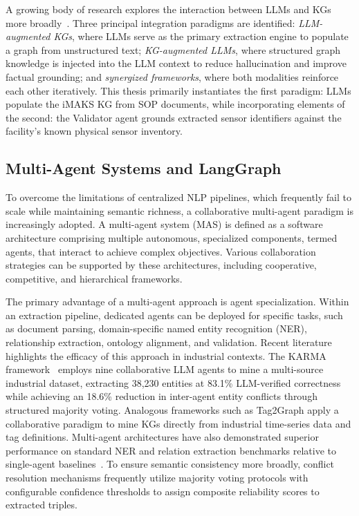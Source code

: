 ﻿\documentclass[11pt]{article}
\begin{document}
A growing body of research explores the interaction between LLMs and KGs more broadly~\cite{pan2024unifying}. Three principal integration paradigms are identified: \emph{LLM-augmented KGs}, where LLMs serve as the primary extraction engine to populate a graph from unstructured text; \emph{KG-augmented LLMs}, where structured graph knowledge is injected into the LLM context to reduce hallucination and improve factual grounding; and \emph{synergized frameworks}, where both modalities reinforce each other iteratively. This thesis primarily instantiates the first paradigm: LLMs populate the iMAKS KG from SOP documents, while incorporating elements of the second: the Validator agent grounds extracted sensor identifiers against the facility's known physical sensor inventory.

\subsection{Multi-Agent Systems and LangGraph}
\label{sec:bg_mas}

To overcome the limitations of centralized NLP pipelines, which frequently fail to scale while maintaining semantic richness, a collaborative multi-agent paradigm is increasingly adopted. A multi-agent system (MAS) is defined as a software architecture comprising multiple autonomous, specialized components, termed agents, that interact to achieve complex objectives. Various collaboration strategies can be supported by these architectures, including cooperative, competitive, and hierarchical frameworks. 

The primary advantage of a multi-agent approach is agent specialization. Within an extraction pipeline, dedicated agents can be deployed for specific tasks, such as document parsing, domain-specific named entity recognition (NER), relationship extraction, ontology alignment, and validation. Recent literature highlights the efficacy of this approach in industrial contexts. The KARMA framework~\cite{lu2025karma} employs nine collaborative LLM agents to mine a multi-source industrial dataset, extracting 38,230 entities at 83.1\% LLM-verified correctness while achieving an 18.6\% reduction in inter-agent entity conflicts through structured majority voting. Analogous frameworks such as Tag2Graph apply a collaborative paradigm to mine KGs directly from industrial time-series data and tag definitions. Multi-agent architectures have also demonstrated superior performance on standard NER and relation extraction benchmarks relative to single-agent baselines~\cite{chen2024multiagent}. To ensure semantic consistency more broadly, conflict resolution mechanisms frequently utilize majority voting protocols with configurable confidence thresholds to assign composite reliability scores to extracted triples.
\end{document}
